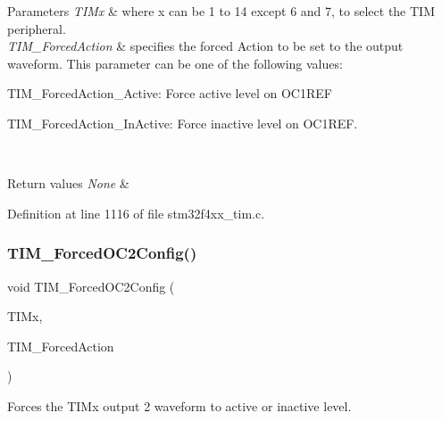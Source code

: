 \begin{DoxyParams}{Parameters}
{\em T\+I\+Mx} & where x can be 1 to 14 except 6 and 7, to select the T\+IM peripheral. \\
\hline
{\em T\+I\+M\+\_\+\+Forced\+Action} & specifies the forced Action to be set to the output waveform. This parameter can be one of the following values\+: \begin{DoxyItemize}
\item T\+I\+M\+\_\+\+Forced\+Action\+\_\+\+Active\+: Force active level on O\+C1\+R\+EF \item T\+I\+M\+\_\+\+Forced\+Action\+\_\+\+In\+Active\+: Force inactive level on O\+C1\+R\+EF. \end{DoxyItemize}
\\
\hline
\end{DoxyParams}

\begin{DoxyRetVals}{Return values}
{\em None} & \\
\hline
\end{DoxyRetVals}


Definition at line 1116 of file stm32f4xx\+\_\+tim.\+c.

\mbox{\label{group___t_i_m___group2_ga3d2902b6fbab8dd55cd531055ffcc63d}} 
\subsubsection{\texorpdfstring{T\+I\+M\+\_\+\+Forced\+O\+C2\+Config()}{TIM\_ForcedOC2Config()}}
{\footnotesize\ttfamily void T\+I\+M\+\_\+\+Forced\+O\+C2\+Config (\begin{DoxyParamCaption}\item[{\hyperlink{struct_t_i_m___type_def}{T\+I\+M\+\_\+\+Type\+Def} $\ast$}]{T\+I\+Mx,  }\item[{uint16\+\_\+t}]{T\+I\+M\+\_\+\+Forced\+Action }\end{DoxyParamCaption})}



Forces the T\+I\+Mx output 2 waveform to active or inactive level. 


